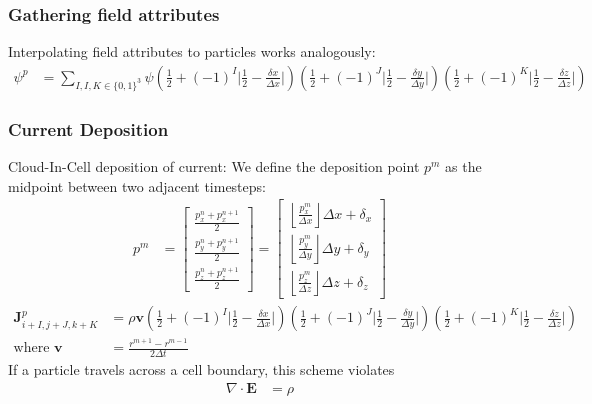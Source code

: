 \documentclass[5pt]{beamer}
\begin{document}
  \begin{frame}
  \frametitle{Gathering field attributes}
  Interpolating field attributes to particles works analogously:
  {\scriptsize
  \begin{align*}
      \psi^p &= \sum_{I,I,K \in \{0,1\}^3} \psi \left(\frac{1}{2} + (-1)^I \bigg\rvert \frac{1}{2} - \frac{\delta x}{\Delta x} \bigg\rvert \right)
                                                \left(\frac{1}{2} + (-1)^J \bigg\rvert \frac{1}{2} - \frac{\delta y}{\Delta y} \bigg\rvert \right)
                                                \left(\frac{1}{2} + (-1)^K \bigg\rvert \frac{1}{2} - \frac{\delta z}{\Delta z} \bigg\rvert \right)
  \end{align*}
  }%
  \end{frame}
  \begin{frame}
  \frametitle{Current Deposition}
  Cloud-In-Cell deposition of current: 
  We define the deposition point $p^m$ as the midpoint between two adjacent timesteps:
  {\scriptsize
  \begin{align}
  p^m &= \begin{bmatrix} \frac{p_x^n + p_x^{n+1}}{2} \\ \frac{p_y^n + p_y^{n+1}}{2} \\ \frac{p_z^n + p_z^{n+1}}{2} \end{bmatrix} = 
  \begin{bmatrix} 
  \left \lfloor{\frac{p^m_x}{\Delta x}}\right \rfloor \Delta x + \delta_x \\ 
  \left \lfloor{\frac{p^m_y}{\Delta y}}\right \rfloor \Delta y + \delta_y \\ 
  \left \lfloor{\frac{p^m_z}{\Delta z}}\right \rfloor \Delta z + \delta_z \end{bmatrix}
  \end{align}
  }%
  {\scriptsize
  \begin{align}
  \mathbf{J}^p_{i+I,j+J,k+K} &= \rho\mathbf{v}\left(\frac{1}{2} + (-1)^I \bigg\rvert \frac{1}{2} - \frac{\delta x}{\Delta x} \bigg\rvert \right)
                                    \left(\frac{1}{2} + (-1)^J \bigg\rvert \frac{1}{2} - \frac{\delta y}{\Delta y} \bigg\rvert \right)
                                    \left(\frac{1}{2} + (-1)^K \bigg\rvert \frac{1}{2} - \frac{\delta z}{\Delta z} \bigg\rvert \right) \\
                                    \text{where } \mathbf{v} &= \frac{r^{m + 1} - r^{m - 1}}{2 \Delta t}
  \end{align}
  }%
  \pause
  If a particle travels across a cell boundary, this scheme violates
  {\scriptsize
  \begin{align}
  \nabla \cdot \mathbf{E} &= \rho
  \end{align}
  }%
  \end{frame}
\end{document}
